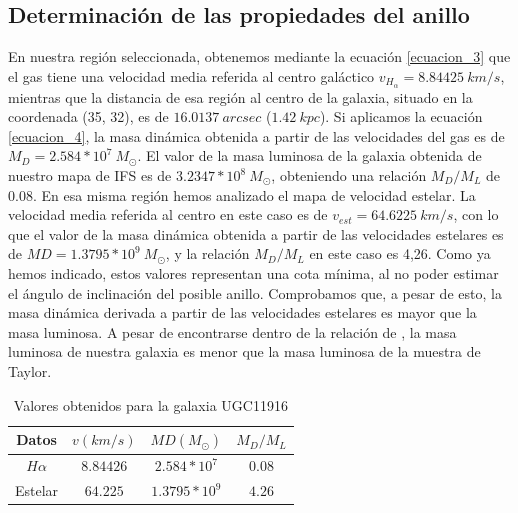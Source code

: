 \documentclass{article}
\begin{document}
\subsection{Determinación de las propiedades del anillo}
En nuestra región seleccionada, obtenemos mediante la ecuación \ref{ecuacion_3} que el gas tiene una velocidad media referida al centro galáctico $v_{H_{\alpha}} = 8.84425\ km/s$, mientras que la distancia de esa región al centro de la galaxia, situado en la coordenada (35, 32), es de $16.0137\ arcsec$ ($1.42\ kpc$). Si aplicamos la ecuación \ref{ecuacion_4}, la masa dinámica obtenida a partir de las velocidades del gas es de $M_{D} = 2.584*10^{7}\ M_{\odot}$. El valor de la masa luminosa de la galaxia obtenida de nuestro mapa de IFS es de $3.2347*10^{8}\ M_{\odot}$, obteniendo una relación $M_{D} / M_{L}$ de 0.08.
En esa misma región hemos analizado el mapa de velocidad estelar. La velocidad media referida al centro en este caso es de $v_{est} = 64.6225\ km/s$, con lo que el valor de la masa dinámica obtenida a partir de las velocidades estelares es de $MD = 1.3795*10^{9}\ M_{\odot}$, y la relación $M_{D} / M_{L}$ en este caso es 4,26. Como ya hemos indicado, estos valores representan una cota mínima, al no poder estimar el ángulo de inclinación del posible anillo. Comprobamos que, a pesar de esto, la masa dinámica derivada a partir de las velocidades estelares es mayor que la masa luminosa. A pesar de encontrarse dentro de la relación de \cite{Taylor2010}, la masa luminosa de nuestra galaxia es menor que la masa luminosa de la muestra de Taylor.
\begin{table}[H]
\centering
\begin{tabular}{cccc} \toprule
Datos & $v(km/s)$ & $MD(M_{\odot})$ & $M_{D} / M_{L}$\\ \midrule
$H\alpha$ & $8.84426$ & $2.584*10^{7}$ & $0.08$\\
Estelar & $64.225$ & $1.3795*10^{9}$ & $4.26$\\ \bottomrule
\end{tabular}
\caption{Valores obtenidos para la galaxia UGC11916}
\label{Tabla_1}
\end{table}
\end{document}
